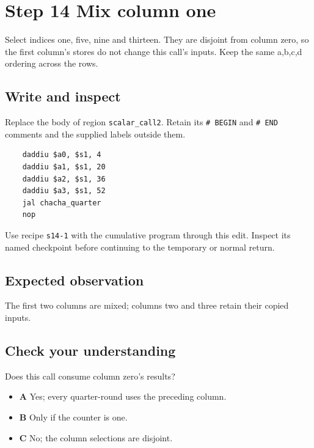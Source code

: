 \section{Step 14 Mix column one}\label{chacha-s14}

Select indices one, five, nine and thirteen. They are disjoint from column zero, so the first column's stores do not change this call's inputs. Keep the same a,b,c,d ordering across the rows.

\subsection{Write and inspect}
Replace the body of region \texttt{scalar\_call2}. Retain its \texttt{\# BEGIN} and \texttt{\# END} comments and the supplied labels outside them.

\begin{verbatim}
    daddiu $a0, $s1, 4
    daddiu $a1, $s1, 20
    daddiu $a2, $s1, 36
    daddiu $a3, $s1, 52
    jal chacha_quarter
    nop
\end{verbatim}

Use recipe \texttt{s14-1} with the cumulative program through this edit. Inspect its named checkpoint before continuing to the temporary or normal return.

\subsection{Expected observation}
The first two columns are mixed; columns two and three retain their copied inputs.

\subsection{Check your understanding}
Does this call consume column zero's results?

\begin{itemize}
\item \textbf{A} Yes; every quarter-round uses the preceding column.
\item \textbf{B} Only if the counter is one.
\item \textbf{C} No; the column selections are disjoint.
\end{itemize}
